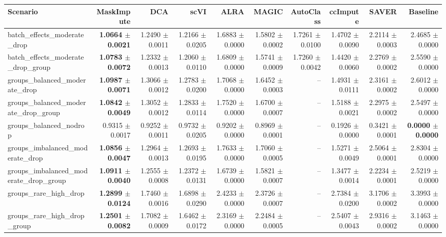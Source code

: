 \begin{tabular}{@{}lrrrrrrrrr@{}}
\toprule
Scenario & MaskImpute & DCA & scVI & ALRA & MAGIC & AutoClass & ccImpute & SAVER & Baseline \\
\midrule
batch\_effects\_moderate\_drop & \textbf{1.0664 $\pm$ 0.0021} & 1.2490 $\pm$ 0.0011 & 1.2166 $\pm$ 0.0205 & 1.6883 $\pm$ 0.0000 & 1.5802 $\pm$ 0.0002 & 1.7261 $\pm$ 0.0100 & 1.4702 $\pm$ 0.0090 & 2.2114 $\pm$ 0.0003 & 2.4685 $\pm$ 0.0000 \\
batch\_effects\_moderate\_drop\_group & \textbf{1.0783 $\pm$ 0.0072} & 1.2332 $\pm$ 0.0013 & 1.2060 $\pm$ 0.0110 & 1.6809 $\pm$ 0.0000 & 1.5741 $\pm$ 0.0009 & 1.7260 $\pm$ 0.0042 & 1.4420 $\pm$ 0.0060 & 2.2769 $\pm$ 0.0002 & 2.5590 $\pm$ 0.0000 \\
groups\_balanced\_moderate\_drop & \textbf{1.0987 $\pm$ 0.0071} & 1.3066 $\pm$ 0.0012 & 1.2783 $\pm$ 0.0200 & 1.7068 $\pm$ 0.0000 & 1.6452 $\pm$ 0.0003 & -- & 1.4931 $\pm$ 0.0111 & 2.3161 $\pm$ 0.0002 & 2.6012 $\pm$ 0.0000 \\
groups\_balanced\_moderate\_drop\_group & \textbf{1.0842 $\pm$ 0.0049} & 1.3052 $\pm$ 0.0012 & 1.2833 $\pm$ 0.0114 & 1.7520 $\pm$ 0.0000 & 1.6700 $\pm$ 0.0007 & -- & 1.5188 $\pm$ 0.0021 & 2.2975 $\pm$ 0.0002 & 2.5497 $\pm$ 0.0000 \\
groups\_balanced\_nodrop & 0.9315 $\pm$ 0.0017 & 0.9252 $\pm$ 0.0011 & 0.9732 $\pm$ 0.0205 & 0.9202 $\pm$ 0.0000 & 0.8969 $\pm$ 0.0001 & -- & 0.1926 $\pm$ 0.0000 & 0.3421 $\pm$ 0.0001 & \textbf{0.0000 $\pm$ 0.0000} \\
groups\_imbalanced\_moderate\_drop & \textbf{1.0856 $\pm$ 0.0047} & 1.2964 $\pm$ 0.0013 & 1.2693 $\pm$ 0.0195 & 1.7633 $\pm$ 0.0000 & 1.7060 $\pm$ 0.0005 & -- & 1.5271 $\pm$ 0.0049 & 2.5064 $\pm$ 0.0001 & 2.8304 $\pm$ 0.0000 \\
groups\_imbalanced\_moderate\_drop\_group & \textbf{1.0911 $\pm$ 0.0040} & 1.2555 $\pm$ 0.0008 & 1.2372 $\pm$ 0.0131 & 1.6739 $\pm$ 0.0000 & 1.5821 $\pm$ 0.0007 & -- & 1.3477 $\pm$ 0.0014 & 2.2234 $\pm$ 0.0001 & 2.5219 $\pm$ 0.0000 \\
groups\_rare\_high\_drop & \textbf{1.2899 $\pm$ 0.0124} & 1.7460 $\pm$ 0.0016 & 1.6898 $\pm$ 0.0290 & 2.4233 $\pm$ 0.0000 & 2.3726 $\pm$ 0.0007 & -- & 2.7384 $\pm$ 0.0200 & 3.1706 $\pm$ 0.0002 & 3.3993 $\pm$ 0.0000 \\
groups\_rare\_high\_drop\_group & \textbf{1.2501 $\pm$ 0.0082} & 1.7082 $\pm$ 0.0009 & 1.6462 $\pm$ 0.0172 & 2.3169 $\pm$ 0.0000 & 2.2484 $\pm$ 0.0005 & -- & 2.5407 $\pm$ 0.0043 & 2.9316 $\pm$ 0.0002 & 3.1463 $\pm$ 0.0000 \\

\end{tabular}
